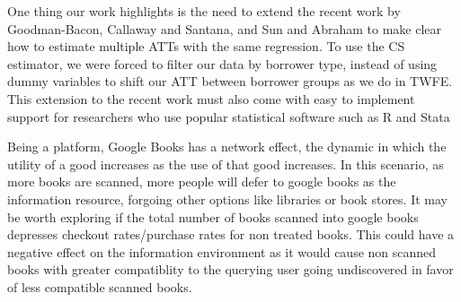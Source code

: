 \documentclass{article}
\begin{document}
One thing our work highlights is the need to extend the recent work by Goodman-Bacon, Callaway and Santana, and Sun and Abraham to make clear how to estimate multiple ATTs with the same regression. To use the CS estimator, we were forced to filter our data by borrower type, instead of using dummy variables to shift our ATT between borrower groups as we do in TWFE. This extension to the recent work must also come with easy to implement support for researchers who use popular statistical software such as R and Stata

Being a platform, Google Books has a network effect, the dynamic in which the utility of a good increases as the use of that good increases. In this scenario, as more books are scanned, more people will defer to google books as the information resource, forgoing other options like libraries or book stores. It may be worth exploring if the total number of books scanned into google books depresses checkout rates/purchase rates for non treated books. This could have a negative effect on the information environment as it would cause non scanned books with greater compatiblity to the querying user going undiscovered in favor of less compatible scanned books. 

\newpage

\end{document}
